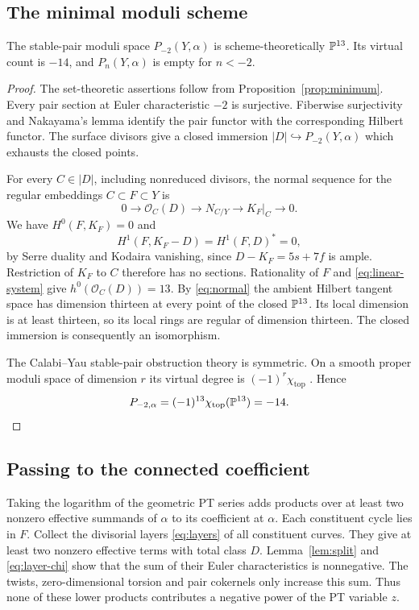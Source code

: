 \subsection{The minimal moduli scheme}
\begin{proposition}\label{prop:pt-count}
The stable-pair moduli space $P_{-2}(Y,\alpha)$ is
scheme-theoretically $\mathbb P^{13}$. Its virtual count is $-14$, and
$P_n(Y,\alpha)$ is empty for $n<-2$.
\end{proposition}
\begin{proof}
The set-theoretic assertions follow from Proposition~\ref{prop:minimum}.
Every pair section at Euler characteristic $-2$ is surjective.
Fiberwise surjectivity and Nakayama's lemma identify the pair
functor with the corresponding Hilbert functor. The surface divisors
give a closed immersion $|D|\hookrightarrow P_{-2}(Y,\alpha)$
which exhausts the closed points.

For every $C\in|D|$, including nonreduced divisors, the normal
sequence for the regular embeddings $C\subset F\subset Y$ is
\begin{equation}\label{eq:normal}
 0\longrightarrow\mathcal O_C(D)\longrightarrow N_{C/Y}
 \longrightarrow K_F|_C\longrightarrow0.
\end{equation}
We have $H^0(F,K_F)=0$ and
\[
 H^1(F,K_F-D)=H^1(F,D)^*=0,
\]
by Serre duality and Kodaira vanishing, since
$D-K_F=5s+7f$ is ample. Restriction of $K_F$ to $C$ therefore
has no sections. Rationality of $F$ and \eqref{eq:linear-system}
give $h^0(\mathcal O_C(D))=13$. By \eqref{eq:normal} the
ambient Hilbert tangent space has dimension thirteen at every
point of the closed $\mathbb P^{13}$. Its local dimension is at least
thirteen, so its local rings are regular of dimension thirteen.
The closed immersion is consequently an isomorphism.

The Calabi--Yau stable-pair obstruction theory is symmetric. On a
smooth proper moduli space of dimension $r$ its virtual degree is
$(-1)^r\chi_{\mathrm{top}}$ \cite[p.~3]{PT}. Hence
\begin{equation}\label{eq:minus-fourteen}
 P_{-2,\alpha}=(-1)^{13}\chi_{\mathrm{top}}(\mathbb P^{13})=-14.
\end{equation}
\end{proof}

\subsection{Passing to the connected coefficient}
Taking the logarithm of the geometric PT series adds products
over at least two nonzero effective summands of $\alpha$ to its
coefficient at $\alpha$. Each constituent cycle lies in $F$.
Collect the divisorial layers \eqref{eq:layers} of all constituent
curves. They give at least two nonzero effective terms with total
class $D$. Lemma~\ref{lem:split} and \eqref{eq:layer-chi} show
that the sum of their Euler characteristics is nonnegative.
The twists, zero-dimensional torsion and pair cokernels only
increase this sum. Thus none of these lower products contributes
a negative power of the PT variable $z$.

